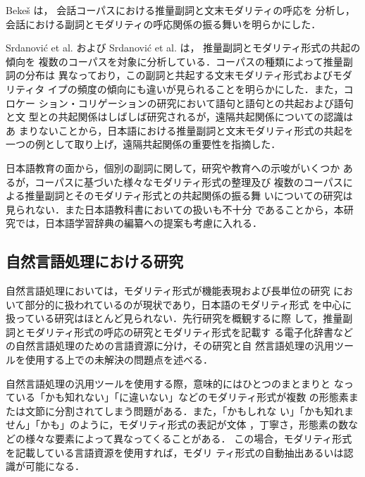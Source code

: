 \documentclass[japanese]{jnlp_1.4}
\begin{document}
    Beke\v{s} \citeyear{Bekes}は，
会話コーパスにおける推量副詞と文末モダリティの呼応を
分析し，会話における副詞とモダリティの呼応関係の振る舞いを明らかにした．

    Srdanovi\'{c} et al. \citeyear{Srdanovic2008a}および Srdanovi\'{c} et al. \citeyear{Srdanovic2008c}は，
推量副詞とモダリティ形式の共起の傾向を
複数のコーパスを対象に分析している．コーパスの種類によって推量副詞の分布は
異なっており，この副詞と共起する文末モダリティ形式およびモダリティタ
イプの頻度の傾向にも違いが見られることを明らかにした．また，コロケー
ション・コリゲーションの研究において語句と語句との共起および語句と文
型との共起関係はしばしば研究されるが，遠隔共起関係についての認識はあ
まりないことから，日本語における推量副詞と文末モダリティ形式の共起を
一つの例として取り上げ，遠隔共起関係の重要性を指摘した．

日本語教育の面から，個別の副詞に関して，研究や教育への示唆がいくつか
あるが\cite{Sunakawa}，コーパスに基づいた様々なモダリティ形式の整理及び
複数のコーパスによる推量副詞とそのモダリティ形式との共起関係の振る舞
いについての研究は見られない．また日本語教科書においての扱いも不十分
であることから，本研究では，日本語学習辞典の編纂への提案も考慮に入れる．


\subsection{自然言語処理における研究}

自然言語処理においては，モダリティ形式が機能表現および長単位の研究
において部分的に扱われているのが現状であり，日本語のモダリティ形式
を中心に扱っている研究はほとんど見られない．先行研究を概観するに際
して，推量副詞とモダリティ形式の呼応の研究とモダリティ形式を記載す
る電子化辞書などの自然言語処理のための言語資源に分け，その研究と自
然言語処理の汎用ツールを使用する上での未解決の問題点を述べる．


自然言語処理の汎用ツールを使用する際，意味的にはひとつのまとまりと
なっている「かも知れない」「に違いない」などのモダリティ形式が複数
の形態素または文節に分割されてしまう問題がある．また，「かもしれな
い」「かも知れません」「かも」のように，モダリティ形式の表記が文体
，丁寧さ，形態素の数などの様々な要素によって異なってくることがある．
この場合，モダリティ形式を記載している言語資源を使用すれば，モダリ
ティ形式の自動抽出あるいは認識が可能になる．
\end{document}
